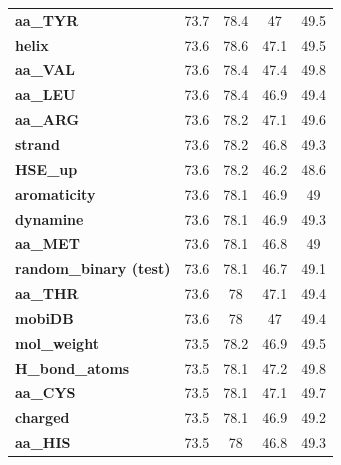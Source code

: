 \begin{table}[]
{\begin{tabular}{lcccc}
\textbf{aa\_TYR}              & 73.7           & 78.4               & 47             & 49.5               \\
\textbf{helix}                & 73.6           & 78.6               & 47.1           & 49.5               \\
\textbf{aa\_VAL}              & 73.6           & 78.4               & 47.4           & 49.8               \\
\textbf{aa\_LEU}              & 73.6           & 78.4               & 46.9           & 49.4               \\
\textbf{aa\_ARG}              & 73.6           & 78.2               & 47.1           & 49.6               \\
\textbf{strand}               & 73.6           & 78.2               & 46.8           & 49.3               \\
\textbf{HSE\_up}              & 73.6           & 78.2               & 46.2           & 48.6               \\
\textbf{aromaticity}          & 73.6           & 78.1               & 46.9           & 49                 \\
\textbf{dynamine}             & 73.6           & 78.1               & 46.9           & 49.3               \\
\textbf{aa\_MET}              & 73.6           & 78.1               & 46.8           & 49                 \\
\textbf{random\_binary (test)}       & 73.6           & 78.1               & 46.7           & 49.1               \\
\textbf{aa\_THR}              & 73.6           & 78                 & 47.1           & 49.4               \\
\textbf{mobiDB}               & 73.6           & 78                 & 47             & 49.4               \\
\textbf{mol\_weight}          & 73.5           & 78.2               & 46.9           & 49.5               \\
\textbf{H\_bond\_atoms}       & 73.5           & 78.1               & 47.2           & 49.8               \\
\textbf{aa\_CYS}              & 73.5           & 78.1               & 47.1           & 49.7               \\
\textbf{charged}              & 73.5           & 78.1               & 46.9           & 49.2               \\
\textbf{aa\_HIS}              & 73.5           & 78                 & 46.8           & 49.3               \\

\end{tabular}}
\end{table}
